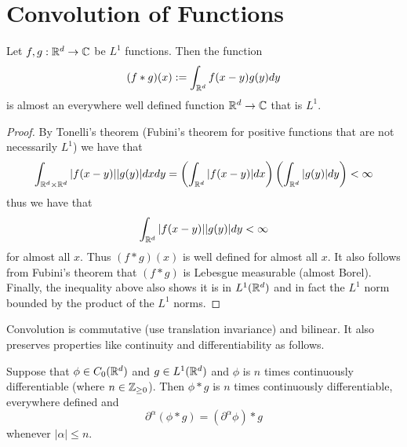 \documentclass[twoside, a4paper, 10pt]{amsart}
\begin{document}
\section{Convolution of Functions}

\begin{prop}\label{prop: convolution of L1 is L1} Let $f,g:\mathbb{R}^d \to \mathbb{C}$ be $L^1$ functions. Then the function $$(f * g) (x) := \int_{\mathbb{R}^d} f(x-y)g(y) dy$$ is almost an everywhere well defined function $\mathbb{R}^d \to \mathbb{C}$ that is $L^1$.

\end{prop}

\begin{proof} By Tonelli's theorem (Fubini's theorem for positive functions that are not necessarily $L^1$) we have that $$\int_{\mathbb{R}^d \times \mathbb{R}^d} |f(x-y)||g(y)|dx dy = \left(\int_{\mathbb{R}^d} |f(x-y)| dx \right) \left( \int_{\mathbb{R}^d} |g(y)| dy \right) < \infty$$ thus we have that $$\int_{\mathbb{R}^d} |f(x-y)||g(y)| dy < \infty$$ for almost all $x$. Thus $(f*g)(x)$ is well defined for almost all $x$. It also follows from Fubini's theorem that $(f*g)$ is Lebesgue measurable (almost Borel). Finally, the inequality above also shows it is in $L^1(\mathbb{R}^d)$ and in fact the $L^1$ norm bounded by the product of the $L^1$ norms. \end{proof}

Convolution is commutative (use translation invariance) and bilinear. It also preserves properties like continuity and differentiability as follows.

\begin{prop}\label{prop: derivative of convolution} Suppose that $\phi \in C_0(\mathbb{R}^d)$ and $ g \in L^1(\mathbb{R}^d)$ and $\phi$ is $n$ times continuously differentiable (where $n \in \mathbb{Z}_{\geq 0}$). Then $\phi*g$ is $n$ times continuously differentiable, everywhere defined and $$\partial^{\alpha} (\phi * g) = (\partial^{\alpha} \phi) * g$$ whenever $|\alpha|\leq n$.

\end{prop}
\end{document}
